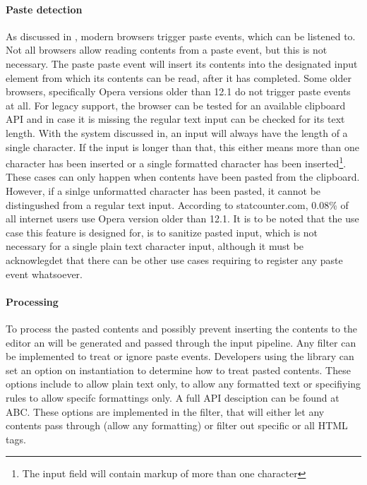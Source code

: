 \paragraph{Paste detection} As discussed in , modern browsers trigger paste events, which can be listened to. Not all browsers allow reading contents from a paste event, but this is not necessary. The paste paste event will insert its contents into the designated input element from which its contents can be read, after it has completed. Some older browsers, specifically Opera versions older than 12.1 do not trigger paste events at all. For legacy support, the browser can be tested for an available clipboard API and in case it is missing the regular text input can be checked for its text length. With the system discussed in, an input will always have the length of a single character. If the input is longer than that, this either means more than one character has been inserted or a single formatted character has been inserted\footnote{The input field will contain markup of more than one character}. These cases can only happen when contents have been pasted from the clipboard. However, if a sinlge unformatted character has been pasted, it cannot be distingushed from a regular text input. According to statcounter.com, 0.08\% of all internet users use Opera version older than 12.1. It is to be noted that the use case this feature is designed for, is to sanitize pasted input, which is not necessary for a single plain text character input, although it must be acknowlegdet that there can be other use cases requiring to register any paste event whatsoever.

\paragraph{Processing} To process the pasted contents and possibly prevent inserting the contents to the editor an  will be generated and passed through the input pipeline. Any filter can be implemented to treat or ignore paste events. Developers using the library can set an option on instantiation to determine how to treat pasted contents. These options include to allow plain text only, to allow any formatted text or specifiying rules to allow specifc formattings only. A full API desciption can be found at ABC. These options are implemented in the  filter, that will either let any contents pass through (allow any formatting) or filter out specific or all HTML tags.


